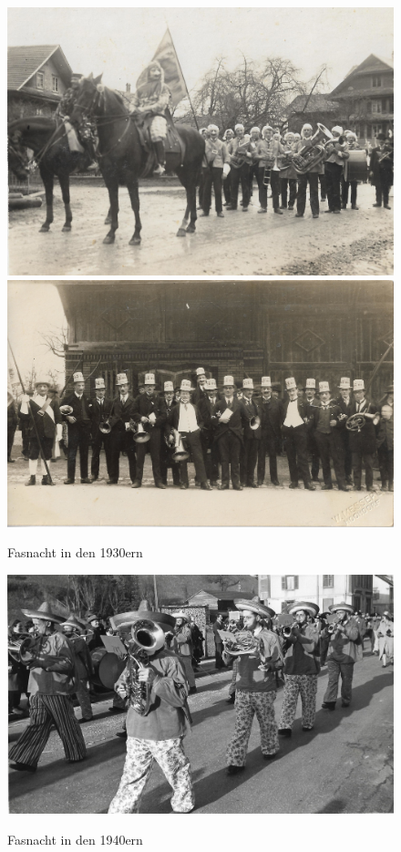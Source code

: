 \documentclass[]{book}
\begin{document}
\begin{figure}[ht]
    \centerline{
        \includegraphics{./chap/1925-1950/Fasnacht-1930er.jpg}
        \includegraphics{./chap/1925-1950/Fasnacht-vor-Kreuz-Scheune-1930er.jpg}
    }
    \label{fig:mgh-fasnacht-1930}
    \caption{Fasnacht in den 1930ern}
\end{figure}
\begin{figure}[ht]
    \centering
    \includegraphics{./chap/1925-1950/Fasnacht-1946.jpg}
    \label{fig:mgh-fasnacht-1940}
    \caption{Fasnacht in den 1940ern}
\end{figure}
\end{document}
